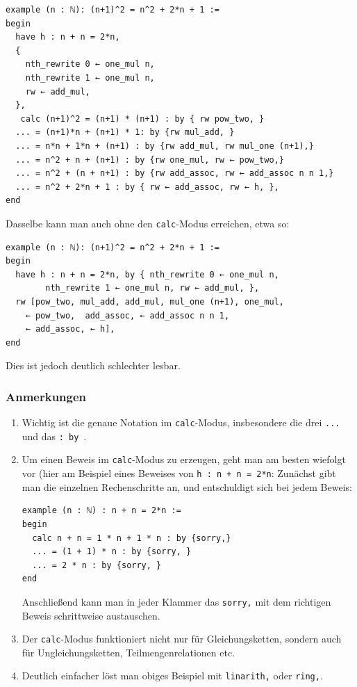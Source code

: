 \documentclass[11pt]{article}
\newcommand{\leanin}{\texttt}
\newcommand{\leanstate}{\texttt}
\begin{document}
\begin{verbatim}
example (n : ℕ): (n+1)^2 = n^2 + 2*n + 1 :=
begin
  have h : n + n = 2*n, 
  {
    nth_rewrite 0 ← one_mul n,
    nth_rewrite 1 ← one_mul n,
    rw ← add_mul,
  },
   calc (n+1)^2 = (n+1) * (n+1) : by { rw pow_two, }
  ... = (n+1)*n + (n+1) * 1: by {rw mul_add, }
  ... = n*n + 1*n + (n+1) : by {rw add_mul, rw mul_one (n+1),}
  ... = n^2 + n + (n+1) : by {rw one_mul, rw ← pow_two,}
  ... = n^2 + (n + n+1) : by {rw add_assoc, rw ← add_assoc n n 1,}
  ... = n^2 + 2*n + 1 : by { rw ← add_assoc, rw ← h, },
end
\end{verbatim}
Dasselbe kann man auch ohne den \leanin{calc}-Modus erreichen, etwa so:

\begin{verbatim}
example (n : ℕ): (n+1)^2 = n^2 + 2*n + 1 :=
begin
  have h : n + n = 2*n, by { nth_rewrite 0 ← one_mul n,
        nth_rewrite 1 ← one_mul n, rw ← add_mul, },
  rw [pow_two, mul_add, add_mul, mul_one (n+1), one_mul,
    ← pow_two,  add_assoc, ← add_assoc n n 1,
    ← add_assoc, ← h],
end
\end{verbatim}
Dies ist jedoch deutlich schlechter lesbar. 

\subsubsection*{Anmerkungen}
\begin{enumerate}
\item Wichtig ist die genaue Notation im \leanin{calc}-Modus, insbesondere die drei \leanin{...} und das \leanin{: by {}}.
\item Um einen Beweis im \leanin{calc}-Modus zu erzeugen, geht man am besten wiefolgt vor (hier am Beispiel eines Beweises von \leanstate{h : n + n = 2*n}: Zunächst gibt man die einzelnen Rechenschritte an, und entschuldigt sich bei jedem Beweis:

\begin{verbatim}
example (n : ℕ) : n + n = 2*n :=
begin
  calc n + n = 1 * n + 1 * n : by {sorry,}
  ... = (1 + 1) * n : by {sorry, }
  ... = 2 * n : by {sorry, }
end
\end{verbatim}
Anschließend kann man in jeder Klammer das \leanin{sorry,} mit dem richtigen Beweis schrittweise austauschen.  
\item Der \leanin{calc}-Modus funktioniert nicht nur für Gleichungsketten, sondern auch für Ungleichungsketten, Teilmengenrelationen etc.
\item Deutlich einfacher löst man obiges Beispiel mit \leanin{linarith,} oder \leanin{ring,}.
\end{enumerate}
\end{document}
